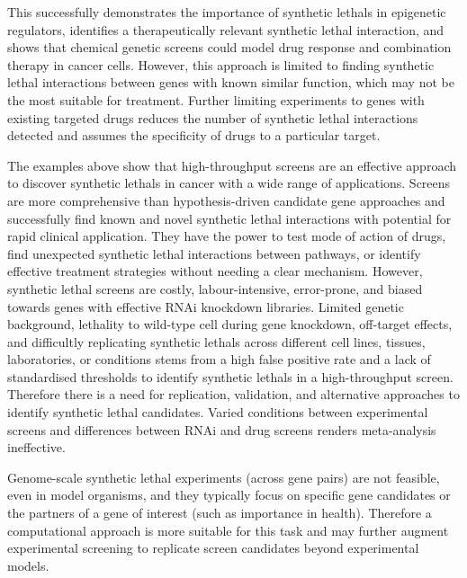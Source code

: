 This successfully demonstrates the importance of \glspl{synthetic lethal} in epigenetic regulators, identifies a therapeutically relevant \gls{synthetic lethal} interaction, and shows that chemical genetic screens could model drug response and combination therapy in cancer cells. However, this approach is limited to finding \gls{synthetic lethal} interactions between genes with known similar function, which may not be the most suitable for treatment. Further limiting experiments to genes with existing targeted drugs reduces the number of \gls{synthetic lethal} interactions detected and assumes the specificity of drugs to a particular target. %

The examples above show that high-throughput screens are an effective approach to discover \glspl{synthetic lethal} in cancer with a wide range of applications. Screens are more comprehensive than hypothesis-driven candidate gene approaches and successfully find known and novel \gls{synthetic lethal} interactions with potential for rapid clinical application. They have the power to test mode of action of drugs, find unexpected \gls{synthetic lethal} interactions between \glspl{pathway}, or identify effective treatment strategies without needing a clear mechanism. However, \gls{synthetic lethal} screens are costly, labour-intensive, error-prone, and biased towards genes with effective \gls{RNAi} knockdown libraries. Limited genetic background, lethality to \gls{wild-type} cell during gene knockdown, off-target effects, and difficultly replicating \glspl{synthetic lethal} across different cell lines, tissues, laboratories, or conditions stems from a high false positive rate and a lack of standardised thresholds to identify \glspl{synthetic lethal} in a high-throughput screen. Therefore there is a need for replication, validation, and alternative approaches to identify \gls{synthetic lethal} candidates. Varied conditions between experimental screens and differences between \gls{RNAi} and drug screens renders meta-analysis ineffective.

Genome-scale \gls{synthetic lethal} experiments (across gene pairs) are not feasible, even in model organisms, and they typically focus on specific gene candidates or the partners of a gene of interest (such as importance in health). Therefore a computational approach is more suitable for this task and may further augment experimental screening to replicate screen candidates beyond experimental models.  

